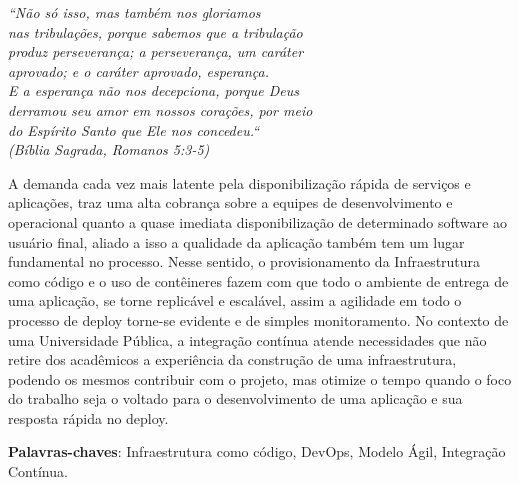 \begin{epigrafe}
    \vspace*{\fill}
	\begin{flushright}
		\textit{``Não só isso, mas também nos gloriamos \\
			nas tribulações, porque sabemos que a tribulação\\
			produz perseverança; a perseverança, um caráter \\
			aprovado; e o caráter aprovado, esperança. \\
			E a esperança não nos decepciona, porque Deus \\
			derramou seu amor em nossos corações, por meio \\
			do Espírito Santo que Ele nos concedeu.``\\
			(Bíblia Sagrada, Romanos 5:3-5)}
			
	\end{flushright}
\end{epigrafe}


\setlength{\absparsep}{18pt} %
\begin{resumo}
A demanda cada vez mais latente pela disponibilização rápida de serviços e aplicações, traz uma alta cobrança sobre a equipes de desenvolvimento e operacional quanto a quase imediata disponibilização de determinado software ao usuário final, aliado a isso a qualidade da aplicação também tem um lugar fundamental no processo. Nesse sentido, o provisionamento da Infraestrutura como código e o uso de contêineres fazem com que todo o ambiente de entrega de uma aplicação, se torne replicável e escalável, assim a agilidade em todo o processo de deploy torne-se evidente e de simples monitoramento. No contexto de uma Universidade Pública, a integração contínua atende necessidades que não retire dos acadêmicos a experiência da construção de uma infraestrutura, podendo os mesmos contribuir com o projeto, mas otimize o tempo quando o foco do trabalho seja o voltado para o desenvolvimento de uma aplicação e sua resposta rápida no deploy.
 

 \textbf{Palavras-chaves}: Infraestrutura como código, DevOps, Modelo Ágil, Integração Contínua.
 
\end{resumo}

